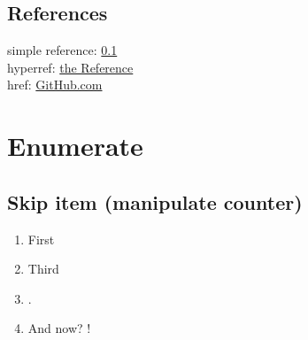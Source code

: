 \documentclass[a4paper, 11pt]{article}
\begin{document}
		\subsection{References}
			\label{theLabel}
			simple reference: \ref{theLabel} \\
			hyperref: \hyperref[theLabel]{the Reference} \\
			href: \href{https://github.com}{GitHub.com}

	\section{Enumerate}\label{sec:enumerate}
		\subsection{Skip item (manipulate counter)}
		\begin{enumerate}
			\item First
			\addtocounter{enumi}{1}
			\item Third
			\item {}.
			\setcounter{enumi}{41}
			\item And now? \theenumi!
		\end{enumerate}
\end{document}
